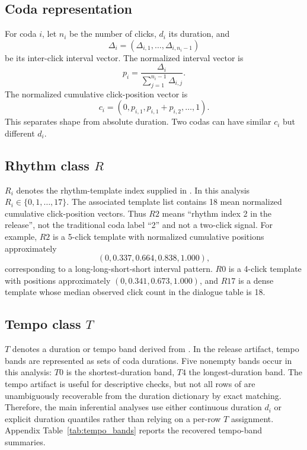 \documentclass[11pt]{article}
\begin{document}
\subsection{Coda representation}

For coda $i$, let $n_i$ be the number of clicks, $d_i$ its duration, and
\begin{equation}
    \Delta_i = (\Delta_{i,1}, \ldots, \Delta_{i,n_i-1})
\end{equation}
be its inter-click interval vector. The normalized interval vector is
\begin{equation}
    p_i = \frac{\Delta_i}{\sum_{j=1}^{n_i-1}\Delta_{i,j}}.
\end{equation}
The normalized cumulative click-position vector is
\begin{equation}
    c_i = \left(0, p_{i,1}, p_{i,1}+p_{i,2}, \ldots, 1\right).
\end{equation}
This separates shape from absolute duration. Two codas can have similar $c_i$ but different $d_i$.

\subsection{Rhythm class \texorpdfstring{$R$}{R}}

$R_i$ denotes the rhythm-template index supplied in . In this analysis $R_i \in \{0,1,\ldots,17\}$. The associated template list  contains 18 mean normalized cumulative click-position vectors. Thus $R2$ means ``rhythm index 2 in the release'', not the traditional coda label ``2'' and not a two-click signal. For example, $R2$ is a 5-click template with normalized cumulative positions approximately
\begin{equation}
    (0, 0.337, 0.664, 0.838, 1.000),
\end{equation}
corresponding to a long-long-short-short interval pattern. $R0$ is a 4-click template with positions approximately $(0,0.341,0.673,1.000)$, and $R17$ is a dense template whose median observed click count in the dialogue table is 18.

\subsection{Tempo class \texorpdfstring{$T$}{T}}

$T$ denotes a duration or tempo band derived from . In the release artifact, tempo bands are represented as sets of coda durations. Five nonempty bands occur in this analysis: $T0$ is the shortest-duration band, $T4$ the longest-duration band. The tempo artifact is useful for descriptive checks, but not all rows of  are unambiguously recoverable from the duration dictionary by exact matching. Therefore, the main inferential analyses use either continuous duration $d_i$ or explicit duration quantiles rather than relying on a per-row $T$ assignment. Appendix Table~\ref{tab:tempo_bands} reports the recovered tempo-band summaries.
\end{document}
